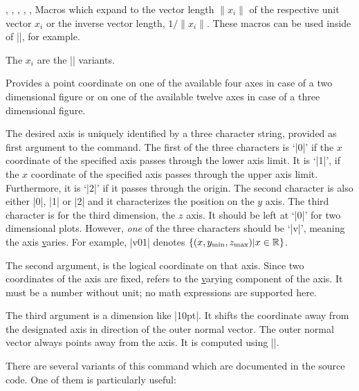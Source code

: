 \begin{commandlist}{%
	\pgfplotsunitxlength,%
	\pgfplotsunitylength,%
	\pgfplotsunitzlength,%
	\pgfplotsunitxinvlength,%
	\pgfplotsunityinvlength,%
	\pgfplotsunitzinvlength}%
	Macros which expand to the vector length $\lVert x_i \rVert$ of the respective unit vector $x_i$ or the inverse vector length, $1/\lVert x_i \rVert$. These macros can be used inside of |\pgfmathparse|, for example.

	The $x_i$ are the |\pgfplotspointunitx| variants.
\end{commandlist}

\begin{command}{\pgfplotsqpointoutsideofaxis{}}
	Provides a point coordinate on one of the available four axes in case of a two dimensional figure or on one of the available twelve axes in case of a three dimensional figure.
	
	The desired axis is uniquely identified by a three character string, provided as first argument to the command. The first of the three characters is `|0|' if the $x$ coordinate of the specified axis passes through the lower axis limit. It is `|1|', if the $x$ coordinate of the specified axis passes through the upper axis limit. Furthermore, it is `|2|' if it passes through the origin. The second character is also either |0|, |1| or |2| and it characterizes the position on the $y$ axis. The third character is for the third dimension, the $z$ axis. It should be left at `|0|' for two dimensional plots. However, \emph{one} of the three characters should be `|v|', meaning the axis \underline varies. For example, |v01| denotes $\{ (x,y_{\text{min}},z_{\text{max}}) \vert x \in \mathbb{R} \}$.
	
	The second argument,  is the logical coordinate on that axis. Since two coordinates of the axis are fixed,  refers to the \underline varying component of the axis. It must be a number without unit; no math expressions are supported here.

	The third argument  is a dimension like |10pt|. It shifts the coordinate away from the designated axis in direction of the outer normal vector. The outer normal vector always points away from the axis. It is computed using
	|\pgfplotspointouternormalvectorofaxis|.

	There are several variants of this command which are documented in the source code. One of them is particularly useful:
\end{command}

